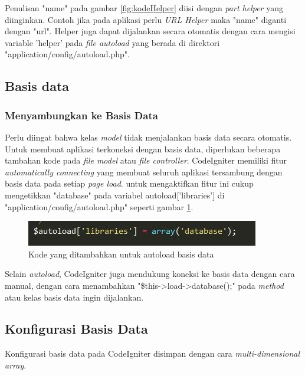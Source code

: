 		Penulisan "name" pada gambar \ref{fig:kodeHelper} diisi dengan \textit{part helper} yang diinginkan. Contoh jika pada aplikasi perlu \textit{URL Helper} maka "name" diganti dengan "url". Helper juga dapat dijalankan secara otomatis dengan cara mengisi variable 'helper' pada \textit{file autoload} yang berada di direktori "application/config/autoload.php".
		
		\subsection{Basis data}
		\label{sub: database}
		
		\subsubsection{Menyambungkan ke Basis Data}
		\label{subsub: connectDatabase}
		
		Perlu diingat bahwa kelas \textit{model} tidak menjalankan basis data secara otomatis. Untuk membuat aplikasi terkoneksi dengan basis data, diperlukan beberapa tambahan kode pada \textit{file model} atau \textit{file controller}.
		CodeIgniter memiliki fitur \textit{automatically connecting} yang membuat seluruh aplikasi tersambung dengan basis data pada setiap \textit{page load}. untuk mengaktifkan fitur ini cukup mengetikkan "database" pada variabel autoload['libraries'] di "application/config/autoload.php" seperti gambar \ref{fig:autoload}.
		
		\begin{figure}[H]
			\centering
			\includegraphics[scale=1]{Gambar/autoload}
			\caption{Kode yang ditambahkan untuk autoload basis data}
			\label{fig:autoload}
		\end{figure}
		
		Selain \textit{autoload}, CodeIgniter juga mendukung koneksi ke basis data dengan cara manual, dengan cara menambahkan "\$this->load->database();" pada \textit{method} atau kelas basis data ingin dijalankan.
		
		\subsection{Konfigurasi Basis Data}
		\label{sub: databaseConf}
		
		Konfigurasi basis data pada CodeIgniter disimpan dengan cara \textit{multi-dimensional array}.
		
